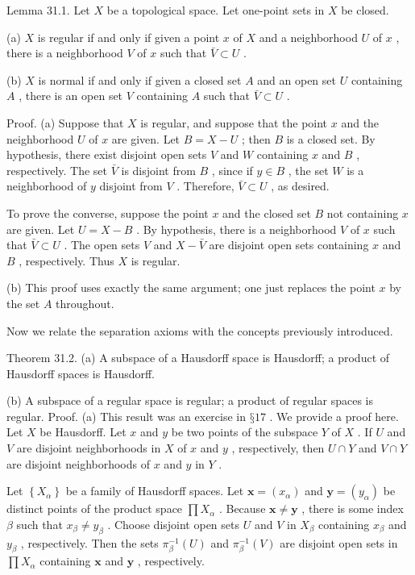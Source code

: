 Lemma 31.1. Let \(X\) be a topological space. Let one-point sets in \(X\) be closed.

(a) \(X\) is regular if and only if given a point \(x\) of \(X\) and a neighborhood \(U\) of \(x\) , there is a neighborhood \(V\) of \(x\) such that \(\bar{V} \subset  U\) .

(b) \(X\) is normal if and only if given a closed set \(A\) and an open set \(U\) containing \(A\) , there is an open set \(V\) containing \(A\) such that \(\bar{V} \subset  U\) .

Proof. (a) Suppose that \(X\) is regular, and suppose that the point \(x\) and the neighborhood \(U\) of \(x\) are given. Let \(B = X - U\) ; then \(B\) is a closed set. By hypothesis, there exist disjoint open sets \(V\) and \(W\) containing \(x\) and \(B\) , respectively. The set \(\bar{V}\) is disjoint from \(B\) , since if \(y \in  B\) , the set \(W\) is a neighborhood of \(y\) disjoint from \(V\) . Therefore, \(\bar{V} \subset  U\) , as desired.

To prove the converse, suppose the point \(x\) and the closed set \(B\) not containing \(x\) are given. Let \(U = X - B\) . By hypothesis, there is a neighborhood \(V\) of \(x\) such that \(\bar{V} \subset  U\) . The open sets \(V\) and \(X - \bar{V}\) are disjoint open sets containing \(x\) and \(B\) , respectively. Thus \(X\) is regular.

(b) This proof uses exactly the same argument; one just replaces the point \(x\) by the set \(A\) throughout.

Now we relate the separation axioms with the concepts previously introduced.

Theorem 31.2. (a) A subspace of a Hausdorff space is Hausdorff; a product of Hausdorff spaces is Hausdorff.

(b) A subspace of a regular space is regular; a product of regular spaces is regular. Proof. (a) This result was an exercise in \(§{17}\) . We provide a proof here. Let \(X\) be Hausdorff. Let \(x\) and \(y\) be two points of the subspace \(Y\) of \(X\) . If \(U\) and \(V\) are disjoint neighborhoods in \(X\) of \(x\) and \(y\) , respectively, then \(U \cap  Y\) and \(V \cap  Y\) are disjoint neighborhoods of \(x\) and \(y\) in \(Y\) .

Let \(\left\{  {X}_{\alpha }\right\}\) be a family of Hausdorff spaces. Let \(\mathbf{x} = \left( {x}_{\alpha }\right)\) and \(\mathbf{y} = \left( {y}_{\alpha }\right)\) be distinct points of the product space \(\prod {X}_{\alpha }\) . Because \(\mathbf{x} \neq  \mathbf{y}\) , there is some index \(\beta\) such that \({x}_{\beta } \neq  {y}_{\beta }\) . Choose disjoint open sets \(U\) and \(V\) in \({X}_{\beta }\) containing \({x}_{\beta }\) and \({y}_{\beta }\) , respectively. Then the sets \({\pi }_{\beta }^{-1}\left( U\right)\) and \({\pi }_{\beta }^{-1}\left( V\right)\) are disjoint open sets in \(\prod {X}_{\alpha }\) containing \(\mathbf{x}\) and \(\mathbf{y}\) , respectively.

